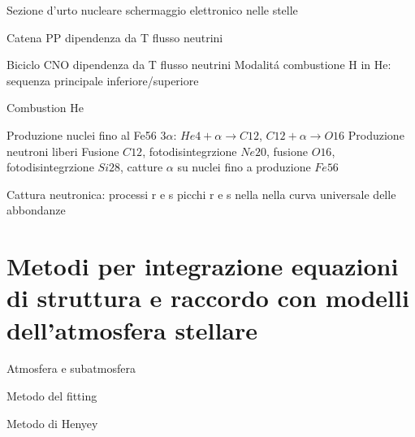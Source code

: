 \begin{frame}{Sezione d'urto nucleare}
schermaggio elettronico nelle stelle
\end{frame}

\begin{frame}{Catena PP}
dipendenza da T
flusso neutrini
\end{frame}

\begin{frame}{Biciclo CNO}
dipendenza da T
flusso neutrini
Modalit\'a combustione H in He: sequenza principale inferiore/superiore
\end{frame}

\begin{frame}{Combustion He}

\end{frame}

\begin{frame}{Produzione nuclei fino al Fe56}
3$\alpha$: $He4+\alpha\to C12$, $C12+\alpha\to O16$
Produzione neutroni liberi
Fusione $C12$, fotodisintegrzione $Ne20$, fusione $O16$, fotodisintegrzione $Si28$, catture $\alpha$ su nuclei fino a produzione $Fe56$
\end{frame}

\begin{frame}{Cattura neutronica: processi r e s}
picchi r e s nella nella curva universale delle abbondanze
\end{frame}

\section{Metodi per integrazione equazioni di struttura e raccordo con modelli dell'atmosfera stellare}

\begin{frame}{Atmosfera e subatmosfera}

\end{frame}

\begin{frame}{Metodo del fitting}

\end{frame}

\begin{frame}{Metodo di Henyey}

\end{frame}